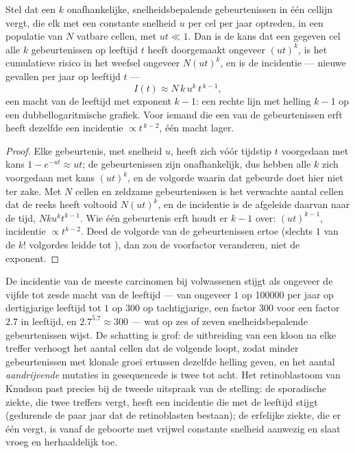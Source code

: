 \begin{theorem}\label{thm:b3:cancer-biology:armitage-doll}
Stel dat een  $k$ onafhankelijke, snelheidsbepalende
gebeurtenissen in één cellijn vergt, die elk met een constante snelheid
$u$ per cel per jaar optreden, in een populatie van $N$ vatbare cellen,
met $ut \ll 1$. Dan is de kans dat een gegeven cel alle $k$
gebeurtenissen op leeftijd $t$ heeft doorgemaakt ongeveer $(ut)^{k}$, is het
cumulatieve risico in het weefsel ongeveer $N(ut)^{k}$, en is de
incidentie --- nieuwe gevallen per jaar op leeftijd $t$ ---
\[
I(t) \approx N\,k\,u^{k}\,t^{\,k-1},
\]
een macht van de leeftijd met exponent $k - 1$: een rechte lijn met
helling $k - 1$ op een dubbellogaritmische grafiek. Voor iemand die een
van de gebeurtenissen erft heeft dezelfde  een incidentie
$\propto t^{\,k-2}$, één macht lager.
\end{theorem}
\begin{proof}
Elke gebeurtenis, met snelheid $u$, heeft zich vóór tijdstip $t$
voorgedaan met kans $1 - e^{-ut} \approx ut$; de gebeurtenissen zijn
onafhankelijk, dus hebben alle $k$ zich voorgedaan met kans
$(ut)^{k}$, en de volgorde waarin dat gebeurde doet hier niet ter zake.
Met $N$ cellen en zeldzame gebeurtenissen is het verwachte aantal
cellen dat de reeks heeft voltooid $N(ut)^{k}$, en de incidentie is de
afgeleide daarvan naar de tijd, $Nku^{k}t^{k-1}$. Wie één gebeurtenis
erft houdt er $k - 1$ over: $(ut)^{k-1}$, incidentie $\propto t^{k-2}$.
Deed de volgorde van de gebeurtenissen ertoe (slechts $1$ van de $k!$
volgordes leidde tot ), dan zou de voorfactor veranderen, niet de
exponent.
\end{proof}

\begin{example}\label{ex:b3:cancer-biology:exponent}
De incidentie van de meeste carcinomen bij volwassenen stijgt als
ongeveer de vijfde tot zesde macht van de leeftijd --- van ongeveer $1$
op \num{100000} per jaar op dertigjarige leeftijd tot $1$ op $300$ op
tachtigjarige, een factor $300$ voor een factor $2.7$ in leeftijd, en
$2.7^{5.7} \approx 300$ --- wat op zes of zeven snelheidsbepalende
gebeurtenissen wijst. De schatting is grof: de uitbreiding van een
kloon na elke treffer verhoogt het aantal cellen dat de volgende loopt,
zodat minder gebeurtenissen met klonale groei ertussen dezelfde helling
geven, en het aantal \emph{aandrijvende} mutaties in gesequencede
 is twee tot acht. Het retinoblastoom van Knudson past precies
bij de tweede uitspraak van de stelling: de sporadische ziekte, die
twee treffers vergt, heeft een incidentie die met de leeftijd stijgt
(gedurende de paar jaar dat de retinoblasten bestaan); de erfelijke
ziekte, die er één vergt, is vanaf de geboorte met vrijwel constante
snelheid aanwezig en slaat vroeg en herhaaldelijk toe.
\end{example}

